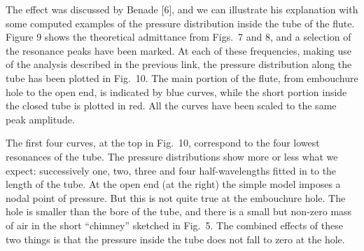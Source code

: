 
  The effect was discussed by Benade [6], and we can illustrate his explanation 
  with some computed examples of the pressure distribution inside the tube of 
  the flute. Figure 9 shows the theoretical admittance from Figs.\ 7 and 8, and 
  a selection of the resonance peaks have been marked. At each of these 
  frequencies, making use of the analysis described in the previous link, the 
  pressure distribution along the tube has been plotted in Fig.\ 10. The main 
  portion of the flute, from embouchure hole to the open end, is indicated by 
  blue curves, while the short portion inside the closed tube is plotted in 
  red. All the curves have been scaled to the same peak amplitude. 



  The first four curves, at the top in Fig.\ 10, correspond to the four lowest 
  resonances of the tube. The pressure distributions show more or less what we 
  expect: successively one, two, three and four half-wavelengths fitted in to 
  the length of the tube. At the open end (at the right) the simple model 
  imposes a nodal point of pressure. But this is not quite true at the 
  embouchure hole. The hole is smaller than the bore of the tube, and there is 
  a small but non-zero mass of air in the short “chimney” sketched in Fig.\ 5. 
  The combined effects of these two things is that the pressure inside the tube 
  does not fall to zero at the hole. 

